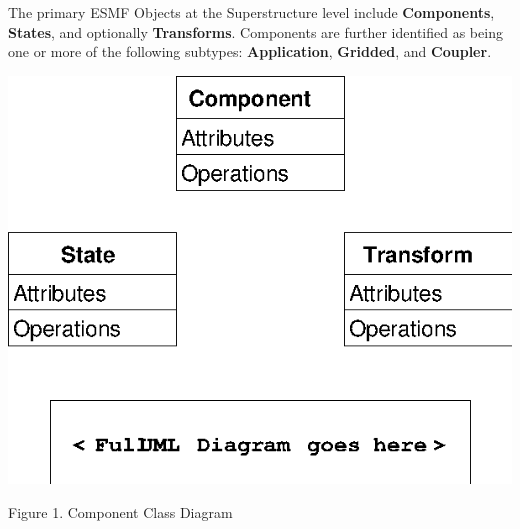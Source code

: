%


The primary ESMF Objects at the Superstructure level include
{\bf Components}, {\bf States}, and optionally {\bf Transforms}.
Components are further identified as being one or more of the following
subtypes: {\bf Application}, {\bf Gridded}, and {\bf Coupler}.

\begin{center}

\includegraphics{comp_obj.eps}
   
Figure 1.  Component Class Diagram
   
\end{center}
